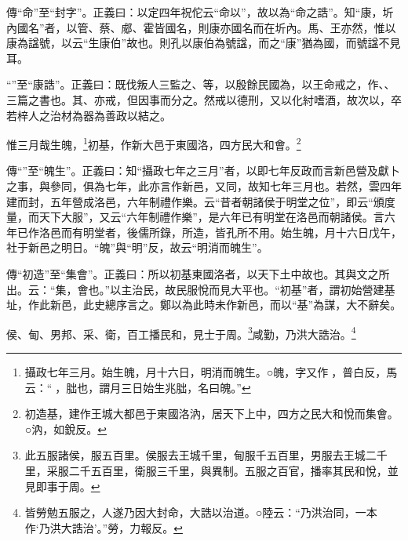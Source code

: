 {\noindent\zhuan{}\fzbyks 傳“命”至“封字”。正義曰：以定四年祝佗云“命以”，故以為“命之誥”。知“康，圻內國名”者，以管、蔡、郕、霍皆國名，則康亦國名而在圻內。馬、王亦然，惟以康為諡號，以云“生康伯”故也。則孔以康伯為號諡，而之“康”猶為國，而號諡不見耳。 \par}

{\noindent\shu{}\fzkt “”至“康誥”。正義曰：既伐叛人三監之、等，以殷餘民國為，以王命戒之，作、、三篇之書也。其、亦戒，但因事而分之。然戒以德刑，又以化紂嗜酒，故次以，卒若梓人之治材為器為善政以結之。 \par}

惟三月哉生魄，\footnote{攝政七年三月。始生魄，月十六日，明消而魄生。○魄，字又作𩲸，普白反，馬云：“𩲸，朏也，謂月三日始生兆朏，名曰魄。”}初基，作新大邑于東國洛，四方民大和會。\footnote{初造基，建作王城大都邑于東國洛汭，居天下上中，四方之民大和悅而集會。○汭，如銳反。}


{\noindent\zhuan{}\fzbyks 傳“”至“魄生”。正義曰：知“攝政七年之三月”者，以即七年反政而言新邑營及獻卜之事，與參同，俱為七年，此亦言作新邑，又同，故知七年三月也。若然，雲四年建而封，五年營成洛邑，六年制禮作樂。云“昔者朝諸侯于明堂之位”，即云“頒度量，而天下大服”，又云“六年制禮作樂”，是六年已有明堂在洛邑而朝諸侯。言六年已作洛邑而有明堂者，後儒所錄，所造，皆孔所不用。始生魄，月十六日戊午，社于新邑之明日。“魄”與“明”反，故云“明消而魄生”。 \par}

{\noindent\zhuan{}\fzbyks 傳“初造”至“集會”。正義曰：所以初基東國洛者，以天下土中故也。其與文之所出。云：“集，會也。”以主治民，故民服悅而見大平也。“初基”者，謂初始營建基址，作此新邑，此史總序言之。鄭以為此時未作新邑，而以“基”為謀，大不辭矣。 \par}

侯、甸、男邦、采、衛，百工播民和，見士于周。\footnote{此五服諸侯，服五百里。侯服去王城千里，甸服千五百里，男服去王城二千里，采服二千五百里，衛服三千里，與異制。五服之百官，播率其民和悅，並見即事于周。}咸勤，乃洪大誥治。\footnote{皆勞勉五服之，人遂乃因大封命，大誥以治道。○陸云：“乃洪治同，一本作‘乃洪大誥治’。”勞，力報反。}


